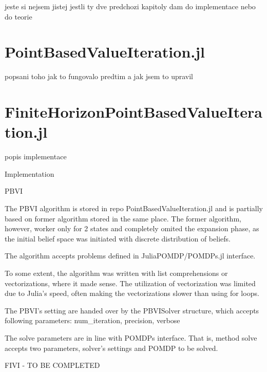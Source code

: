jeste si nejsem jistej jestli ty dve predchozi kapitoly dam do implementace nebo do teorie

\section{PointBasedValueIteration.jl}
popsani toho jak to fungovalo predtim a jak jsem to upravil

\section{FiniteHorizonPointBasedValueIteration.jl}
popis implementace







Implementation

PBVI

The PBVI algorithm is stored in repo PointBasedValueIteration.jl and is partially based on former algorithm stored in the same place. The former algorithm, however, worker only for 2 states and completely omited the expansion phase, as the initial belief space was initiated with discrete distribution of beliefs.


The algorithm accepts problems defined in JuliaPOMDP/POMDPs.jl interface.



To some extent, the algorithm was written with list comprehensions or vectorizations, where it made sense. The utilization of vectorization was limited due to Julia's speed, often making the vectorizations slower than using for loops.



The PBVI's setting are handed over by the PBVISolver structure, which accepts following parameters:
num\_iteration, precision, verbose

The solve parameters are in line with POMDPs interface. That is, method solve accepts two parameters, solver's settings and POMDP to be solved. 


FIVI - TO BE COMPLETED 

















